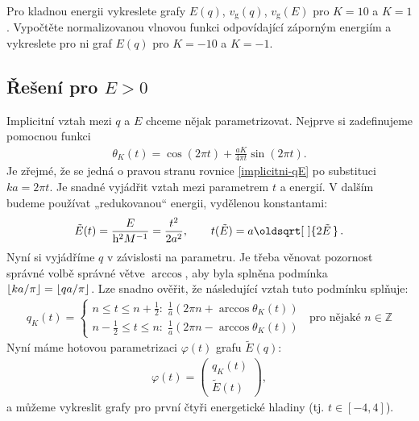 \documentclass[10pt,a4paper]{article}
\renewcommand*{\sqrt}[2][\ ]{\oldsqrt[#1]{#2\,}\,}
\DeclarePairedDelimiter\floor{\lfloor}{\rfloor}
\newcommand{\const}[1]{\text{#1}}
\newcommand{\mat}[1]{
    \begin{pmatrix}
        #1
    \end{pmatrix}
}
\begin{document}
Pro kladnou energii vykreslete grafy $E(q)$, $v_\const{g}(q)$, $v_\const{g}(E)$ pro $K=10$ a $K=1$. Vypočtěte normalizovanou vlnovou funkci odpovídající záporným energiím a vykreslete pro ni graf $E(q)$ pro $K=-10$ a $K=-1$.


\subsection{Řešení pro \texorpdfstring{$E>0$}{E>0}}
Implicitní vztah mezi $q$ a $E$ chceme nějak parametrizovat. Nejprve si zadefinujeme pomocnou funkci
\begin{gather*}
    \theta_K(t) = \cos(2\pi t) + \frac{aK}{4\pi t} \sin(2\pi t).
\end{gather*}
Je zřejmé, že se jedná o pravou stranu rovnice \eqref{implicitni-qE} po substituci $ka=2\pi t$. Je snadné vyjádřit vztah mezi parametrem $t$ a energií. V dalším budeme používat „redukovanou“ energii, vydělenou konstantami:
\begin{gather*}
    \tilde{E}(t) = \frac{E}{\mathrm{h}^2 M^{-1}} = \frac{t^2}{2a^2},
    \hspace{2em}
    t(\tilde{E}) = a \sqrt{2\tilde{E}}.
\end{gather*}
Nyní si vyjádříme $q$ v závislosti na parametru. Je třeba věnovat pozornost správné volbě správné větve $\arccos$, aby byla splněna podmínka $\floor{ka/\pi} = \floor{qa/\pi}$. Lze snadno ověřit, že následující vztah tuto podmínku splňuje:
\begin{gather*}
    q_K(t) = \begin{cases}
        n \leq t \leq n + \frac{1}{2}: \;
        \frac{1}{a} \left( 2\pi n + \arccos \theta_K(t) \right)
        \\[5pt]
        n - \frac{1}{2} \leq t \leq n: \;
        \frac{1}{a} \left( 2\pi n - \arccos \theta_K(t) \right)
    \end{cases}
    \;\;
    \text{pro nějaké } n \in \mathbb{Z}
\end{gather*}
Nyní máme hotovou parametrizaci $\varphi(t)$ grafu $\tilde{E}(q)$:
\begin{gather*}
    \varphi(t) = \mat{
        q_K(t) \\[8pt]
        \tilde{E}(t)
    },
\end{gather*}
a můžeme vykreslit grafy pro první čtyři energetické hladiny (tj. $t \in [-4, 4]$).
\end{document}

